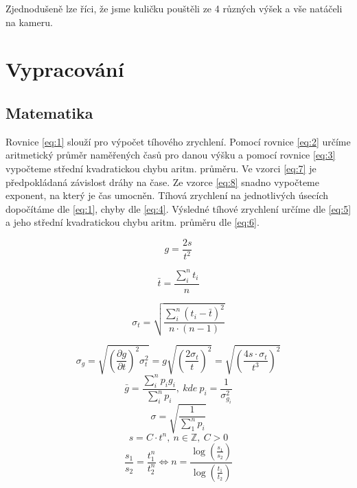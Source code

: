 Zjednodušeně lze říci, že jsme kuličku pouštěli ze 4 různých výšek a vše natáčeli na kameru. 




\section{Vypracování}
\subsection{Matematika}
Rovnice \eqref{eq:1} slouží pro výpočet tíhového zrychlení.
Pomocí rovnice \eqref{eq:2} určíme aritmetický průměr naměřených časů pro danou výšku a pomocí rovnice \eqref{eq:3} vypočteme střední kvadratickou chybu aritm. průměru.
Ve vzorci \eqref{eq:7} je předpokládaná závislost dráhy na čase. Ze vzorce \eqref{eq:8} snadno vypočteme exponent, na který je čas umocněn. Tíhová zrychlení na jednotlivých úsecích dopočítáme dle \eqref{eq:1}, chyby dle \eqref{eq:4}. Výsledné tíhové zrychlení určíme dle \eqref{eq:5} a jeho střední kvadratickou chybu aritm. průměru dle \eqref{eq:6}.



\begin{equation}\label{eq:1}
	g = \frac{2s}{t^2}
\end{equation}

\begin{equation}\label{eq:2}
	\bar{t} = \frac{\sum_{i}^{n} t_i}{n}
\end{equation}

\begin{equation}\label{eq:3}
	\sigma_{t} = \sqrt{\frac{\sum_{i}^{n} (t_i-\bar{t})^2}{n \cdot (n-1)}}
\end{equation}

\begin{equation}\label{eq:4}
	\sigma_{g} = \sqrt{{\left( \frac{\partial g}{\partial t}\right) }^{2}\sigma_{t}^{2}} = g \sqrt{{\left( \frac{2\sigma_{t}}{t}\right) }^{2}} = \sqrt{{\left( \frac{4s\cdot \sigma_{t}}{t^{3}}\right) }^{2}}
\end{equation}
\begin{equation}\label{eq:5}
	\bar{g} = \frac{\sum_{i}^{n} p_i g_i}{\sum_{i}^{n} p_i},~kde~ p_i = \frac{1}{\sigma_{g_i}^{2}}
\end{equation}
\begin{equation}\label{eq:6}
	\sigma = \sqrt{\frac{1}{\sum_{1}^{n}p_i}}
\end{equation}
\begin{equation}\label{eq:7}
	s = C \cdot t^{n},  ~ n\in \mathbb{Z}, ~ C>0
\end{equation}
\begin{equation}\label{eq:8}
	\frac{s_{1}}{s_{2}} = \frac{t_{1}^{n}}{t_{2}^{n}} \Leftrightarrow n = \frac{\log(\frac{s_{1}}{s_{2}})}{\log(\frac{t_{1}}{t_{2}})}
\end{equation}


